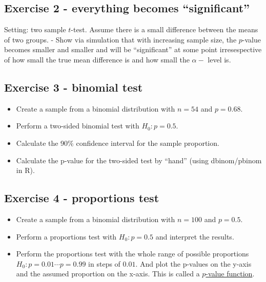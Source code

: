 \documentclass[
]{book}
\providecommand{\tightlist}{%
  \setlength{\itemsep}{0pt}\setlength{\parskip}{0pt}}
\begin{document}
\subsection{Exercise 2 - everything becomes ``significant''}\label{exercise2_nhst}

Setting: two sample \(t\)-test. Assume there is a small difference between the means of two groups.
- Show via simulation that with increasing sample size, the \(p\)-value becomes smaller and
smaller and will be ``significant'' at some point irresespective of how small the true mean
difference is and how small the \(\alpha-\) level is.

\subsection{Exercise 3 - binomial test}\label{exercise3_nhst}

\begin{itemize}
\tightlist
\item
  Create a sample from a binomial distribution with \(n = 54\) and \(p = 0.68\).
\item
  Perform a two-sided binomial test with \(H_0: p = 0.5\).
\item
  Calculate the 90\% confidence interval for the sample proportion.
\item
  Calculate the p-value for the two-sided test by ``hand'' (using dbinom/pbinom in R).
\end{itemize}

\subsection{Exercise 4 - proportions test}\label{exercise4_nhst}

\begin{itemize}
\tightlist
\item
  Create a sample from a binomial distribution with \(n = 100\) and \(p = 0.5\).
\item
  Perform a proportions test with \(H_0: p = 0.5\) and interpret the results.
\item
  Perform the proportions test with the whole range of possible proportions
  \(H_0: p = 0.01 \cdots p = 0.99\) in steps of \(0.01\).
  And plot the p-values on the y-axis and
  the assumed proportion on the x-axis.
  This is called a \href{https://www.tandfonline.com/doi/full/10.1080/00031305.2018.1556735\#:~:text=The\%20p\%2Dvalue\%20function\%20provides,for\%20the\%20parameter\%20of\%20interest.}{\(p\)-value function}.
\end{itemize}
\end{document}
